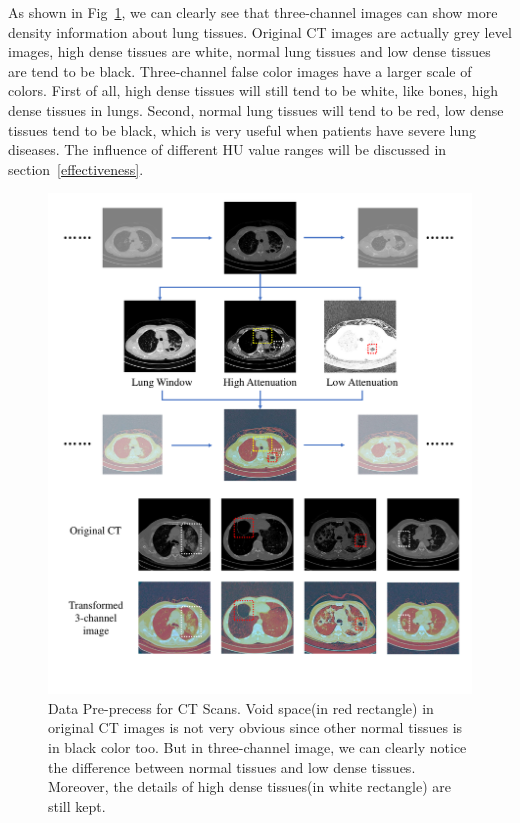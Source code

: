 \documentclass[journal]{IEEEtran}
\begin{document}
As shown in Fig~\ref{3channel}, we can clearly see that three-channel images can show more density information about lung tissues. Original CT images are actually grey level images, high dense tissues are white, normal lung tissues and low dense tissues are tend to be black. 
Three-channel false color images have a larger scale of colors. First of all, high dense tissues will still tend to be white, like bones, high dense tissues in lungs. Second, normal lung tissues will tend to be red, low dense tissues tend to be black, which is very useful when patients have severe lung diseases.
The influence of different HU value ranges will be discussed in section~\ref{effectiveness}.

\begin{figure}[!t]
    \centerline{\includegraphics[width=150mm]{3channel.pdf}}
    \vspace{-1cm}
    \caption{Data Pre-precess for CT Scans. Void space(in red rectangle) in original CT images is not very obvious since other normal tissues is in black color too. But in three-channel image, we can clearly notice the difference between normal tissues and low dense tissues. Moreover, the details of high dense tissues(in white rectangle) are still kept. }
    \vspace{-0cm}
    \label{3channel}
    \end{figure}
\end{document}

